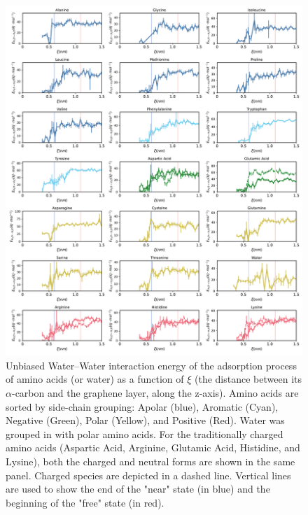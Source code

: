 \documentclass[9pt]{article}
\begin{document}
\begin{figure}[hbtp]
    \centering
    \includegraphics[width=\textwidth]{FigS7.pdf}
    \caption{Unbiased Water--Water interaction energy of the adsorption process of amino acids (or water) as a function of $\xi$ (the distance between its $\alpha$-carbon and the graphene layer, along the z-axis). Amino acids are sorted by side-chain grouping: Apolar (blue), Aromatic (Cyan), Negative (Green), Polar (Yellow), and Positive (Red). Water was grouped in with polar amino acids. For the traditionally charged amino acids (Aspartic Acid, Arginine, Glutamic Acid,  Histidine, and Lysine), both the charged and neutral forms are shown in the same panel. Charged species are depicted in a dashed line. Vertical lines are used to show the end of the "near" state (in blue) and the beginning of the "free" state (in red).}
    \label{fig:EnergyW-W}
\end{figure}
\end{document}
